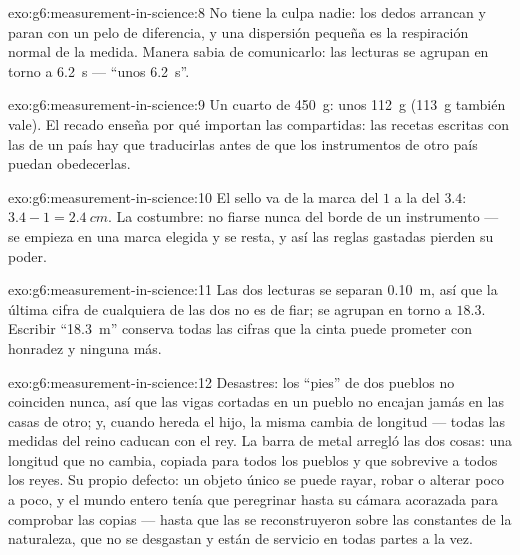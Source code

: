 \begin{solution}{exo:g6:measurement-in-science:8}
No tiene la culpa nadie: los dedos arrancan y paran con un pelo de
diferencia, y una dispersión pequeña es la respiración normal de la
medida. Manera sabia de comunicarlo: las lecturas se agrupan en torno
a \qty{6.2}{s} --- ``unos \qty{6.2}{s}''.
\end{solution}

\begin{solution}{exo:g6:measurement-in-science:9}
Un cuarto de \qty{450}{g}: unos \qty{112}{g} (\qty{113}{g} también
vale). El recado enseña por qué importan las  compartidas:
las recetas escritas con las  de un país hay que
traducirlas antes de que los instrumentos de otro país puedan
obedecerlas.
\end{solution}

\begin{solution}{exo:g6:measurement-in-science:10}
El sello va de la marca del $1$ a la del $3.4$:
$3.4 - 1 = \qty{2.4}{cm}$. La costumbre: no fiarse nunca del borde de
un instrumento --- se empieza en una marca elegida y se resta, y así
las reglas gastadas pierden su poder.
\end{solution}

\begin{solution}{exo:g6:measurement-in-science:11}
Las dos lecturas se separan \qty{0.10}{m}, así que la última cifra de
cualquiera de las dos no es de fiar; se agrupan en torno a $18.3$.
Escribir ``\qty{18.3}{m}'' conserva todas las cifras que la cinta
puede prometer con honradez y ninguna más.
\end{solution}

\begin{solution}{exo:g6:measurement-in-science:12}
Desastres: los ``pies'' de dos pueblos no coinciden nunca, así que las
vigas cortadas en un pueblo no encajan jamás en las casas de otro; y,
cuando hereda el hijo, la  misma cambia de longitud --- todas
las medidas del reino caducan con el rey. La barra de metal arregló
las dos cosas: una longitud que no cambia, copiada para todos los
pueblos y que sobrevive a todos los reyes. Su propio defecto: un
objeto único se puede rayar, robar o alterar poco a poco, y el mundo
entero tenía que peregrinar hasta su cámara acorazada para comprobar
las copias --- hasta que las  se reconstruyeron sobre las
constantes de la naturaleza, que no se desgastan y están de servicio
en todas partes a la vez.
\end{solution}

